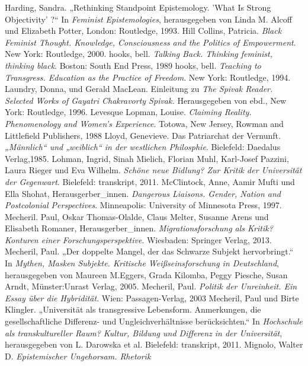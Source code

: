 \begin{thebibliography}{100}
 Harding, Sandra. „Rethinking Standpoint Epistemology. 'What
Is Strong Objectivity' ?“ In \emph{Feminist Epistemologies}, herausgegeben von Linda M. Alcoff und Elizabeth Potter,  London: Routledge, 1993.
 Hill Collins, Patricia. \emph{Black Feminist Thought.
Knowledge, Consciousness and the Politics of Empowerment}. New York: Routledge, 2000.
 hooks, bell. \emph{Talking Back. Thinking feminist, thinking black}. Boston: South End Press, 1989
 hooks, bell. \emph{Teaching to Transgress. Education as the Practice of Freedom}. New York: Routledge, 1994.
 Laundry, Donna, und Gerald MacLean. Einleitung zu \emph{The Spivak Reader. Selected Works of
Gayatri Chakravorty Spivak.} Herausgegeben von ebd., New York: Routledge, 1996.
 Levesque Lopman, Louise. \emph{Claiming Reality. Phenomenology and
Women's Experience}. Totowa, New Jersey, Rowman and Littlefield Publishers, 1988
 Lloyd, Genevieve. Das Patriarchat der Vernunft. \emph{„Männlich“ und „weiblich“ in der westlichen
Philosphie}. Bielefeld: Daedalus Verlag,1985. 
 Lohman, Ingrid,  Sinah Mielich, Florian Muhl, Karl-Josef Pazzini, Laura Rieger und Eva Wilhelm. 
\emph{Schöne neue Bidlung? Zur Kritik der Universität der Gegenwart}. Bielefeld: transkript, 2011.
 McClintock, Anne, Aamir Mufti und Ella Shohat,
Herausgerber\_innen. \emph{Dangerous Liaisons.
Gender, Nation and Postcolonial Perspectives}. Minneapolis: University of Minnesota Press, 1997.
 Mecheril. Paul, Oskar Thomas-Olalde, Claus Melter, Susanne Arens und Elisabeth Romaner,
Herausgerber\_innen. \emph{Migrationsforschung als Kritik? Konturen einer
Forschungsperspektive}. Wiesbaden: Springer Verlag, 2013.
 Mecheril, Paul. „Der doppelte Mangel, der das Schwarze Subjekt hervorbringt.“ In \textit{Mythen, Masken Subjekte. Kritische Weißseinsforschung in Deutschland}, herausgegeben von Maureen M.Eggers, Grada Kilomba, Peggy Piesche, Susan Arndt, Münster:Unrast Verlag, 2005.
 Mecheril, Paul. \emph{Politik der Unreinheit. Ein Essay über die Hybridität}. Wien: Passagen-Verlag, 2003
 Mecheril, Paul und  Birte Klingler. „Universität als
transgressive Lebensform. Anmerkungen, die gesellschaftliche Differenz- und
Ungleichverhältnisse berücksichten.“ In \emph{Hochschule als transkultureller
Raum? Kultur, Bildung und Differenz in der Universität}, herausgegeben von L. Darowska et al. Bielefeld: transkript, 2011. 
 Mignolo, Walter D. \emph{Epistemischer Ungehorsam. Rhetorik
}
\end{thebibliography}
